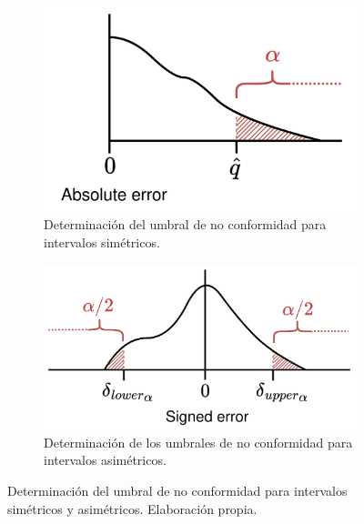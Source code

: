 \begin{enumerate}
\begin{figure}[h]
        \begin{subfigure}[b]{0.45\textwidth}
            \centering
            \includegraphics[width=\textwidth]{capitulos/cap_02/imagenes/nonconformity_quantile_threshold_simetric.png}
            \caption{Determinación del umbral de no conformidad para intervalos simétricos.}
            \label{fig:nonconformity_quantile_threshold_simetric}
        \end{subfigure}
        \hfill
        \begin{subfigure}[b]{0.5\textwidth}
            \centering
            \includegraphics[width=\textwidth]{capitulos/cap_02/imagenes/nonconformity_quantile_threshold_asimetric.png}
            \caption{Determinación de los umbrales de no conformidad para intervalos asimétricos.}
            \label{fig:nonconformity_quantile_threshold_asimetric}
        \end{subfigure}

        \caption[
            Determinación del umbral de no conformidad para intervalos simétricos y asimétricos.
        ]{
            Determinación del umbral de no conformidad para intervalos simétricos y asimétricos. 
            Elaboración propia.
        }
        \label{fig:nonconformity_quantile_comparation}
    \end{figure}

\end{enumerate}

